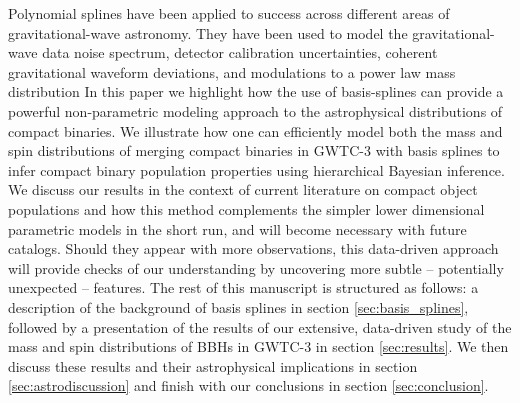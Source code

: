 Polynomial splines have been applied to success across different areas of gravitational-wave astronomy. They have been used to model the gravitational-wave data noise spectrum, 
detector calibration uncertainties, coherent gravitational waveform deviations, and modulations to a power law mass distribution \citep{Littenberg_2015,Edwards_2018,B_Farr_etal_2014,Edelman_2021,Edelman_2022ApJ}
In this paper we highlight how the use of basis-splines can provide a powerful non-parametric modeling approach to the astrophysical distributions of compact 
binaries. We illustrate how one can efficiently model both the mass and spin distributions of merging compact binaries in GWTC-3 with basis splines to infer compact binary population properties using 
hierarchical Bayesian inference. We discuss our results in the context of current literature on compact object populations and how this method complements the simpler lower 
dimensional parametric models in the short run, and will become necessary with future catalogs. Should they appear with more observations, this data-driven approach will provide checks of 
our understanding by uncovering more subtle -- potentially unexpected -- features. The rest of this manuscript is structured as follows: a description of the background of 
basis splines in section \ref{sec:basis_splines}, followed by a presentation of the results of our extensive, data-driven study of the mass and spin distributions of BBHs in GWTC-3 in section 
\ref{sec:results}. We then discuss these results and their astrophysical implications in section \ref{sec:astrodiscussion} and finish with our conclusions in section \ref{sec:conclusion}.